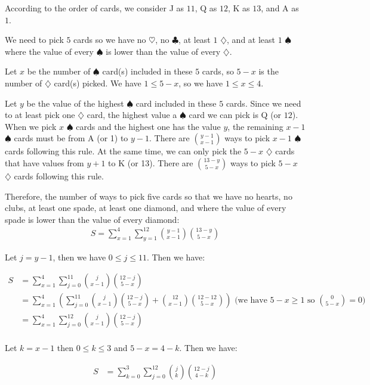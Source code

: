 \documentclass[10pt]{article}
\newcommand{\hs}{\heartsuit}
\newcommand{\sps}{\spadesuit}
\newcommand{\cs}{\clubsuit}
\newcommand{\ds}{\diamondsuit}
\begin{document}
\begin{enumerate}
\begin{enumerate}
According to the order of cards, we consider J as $11$, Q as $12$, K as $13$, and A as $1$.

We need to pick $5$ cards so we have no $\hs$, no $\cs$, at least $1$ $\ds$, and at least $1$ $\sps$ where the value of every $\sps$ is lower than the value of every $\ds$. 

Let $x$ be the number of $\sps$ card(s) included in these $5$ cards, so $5-x$ is the number of $\ds$ card(s) picked. We have $1 \leq 5-x$, so we have $1 \leq x \leq 4$.

Let $y$ be the value of the highest $\sps$ card included in these $5$ cards. Since we need to at least pick one $\ds$ card, the highest value a $\sps$ card we can pick is Q (or $12$). When we pick $x$ $\sps$ cards and the highest one has the value $y$, the remaining $x-1$ $\sps$ cards must be from A (or 1) to $y-1$. There are $\binom{y-1}{x-1}$ ways to pick $x-1$ $\sps$ cards following this rule. At the same time, we can only pick the $5-x$ $\ds$ cards that have values from $y+1$ to K (or 13). There are $\binom{13 - y}{5-x}$ ways to pick $5-x$ $\ds$ cards following this rule.

Therefore, the number of ways to pick five cards so that we have no hearts, no clubs, at least one spade, at least one diamond, and where the value of every spade is lower than the value of every diamond:
\begin{align*}
    S = \sum\limits_{x=1}^4\sum\limits_{y=1}^{12}\binom{y-1}{x-1}\binom{13-y}{5-x} 
\end{align*}

Let $j = y - 1$, then we have $0 \leq j \leq 11$. Then we have: 

\begin{align*}
    S &= \sum\limits_{x=1}^4\sum\limits_{j=0}^{11}\binom{j}{x-1}\binom{12-j}{5-x} \\
    &= \sum\limits_{x=1}^4 \left( \sum\limits_{j=0}^{11}\binom{j}{x-1}\binom{12-j}{5-x}+\binom{12}{x-1}\binom{12-12}{5-x} \right) \text{ (we have $5-x \geq 1$ so $\binom{0}{5-x}=0$)}\\
     &= \sum\limits_{x=1}^4 \sum\limits_{j=0}^{12}\binom{j}{x-1}\binom{12-j}{5-x}\\
\end{align*}

Let $k = x - 1$  then $0 \leq k \leq 3$ and $5-x = 4-k$. Then we have:

\begin{align*}
    S &= \sum\limits_{k=0}^3 \sum\limits_{j=0}^{12}\binom{j}{k}\binom{12-j}{4-k}
\end{align*}


\end{enumerate}
\end{enumerate}
\end{document}
